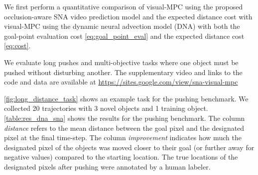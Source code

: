 We first perform a quantitative comparison of visual-MPC using the proposed
occlusion-aware SNA video prediction model and the expected distance cost with visual-MPC using the dynamic neural advection model (DNA)\cite{foresight} with both the goal-point evaluation cost \ref{eq:goal_point_eval} and the expected distance cost \ref{eq:cost}.

We evaluate long pushes and multi-objective tasks where one object must be pushed without disturbing another.
The supplementary video and links to the code and data are available at \url{https://sites.google.com/view/sna-visual-mpc}

\autoref{fig:long_distance_task} shows an example task for the pushing benchmark.
We collected 20 trajectories with 3 novel objects and 1 training object. \autoref{table:res_dna_sna} shows the results for the pushing benchmark. The column \textit{distance} refers to the mean distance between the goal pixel and the designated pixel at the final time-step. The column \textit{improvement} indicates how much the designated pixel of the objects was moved closer to their goal (or further away for negative values) compared to the starting location. The true locations of the designated pixels after pushing were annotated by a human labeler.

